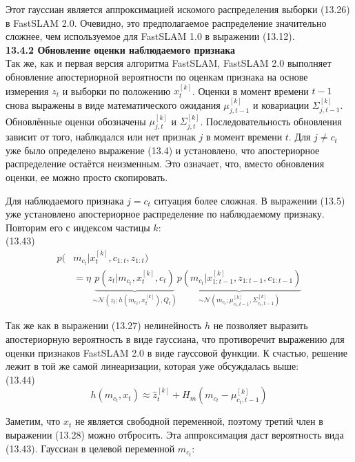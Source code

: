 \documentclass[10pt,a4paper]{article}
\begin{document}
Этот гауссиан является аппроксимацией искомого распределения выборки (13.26) в FastSLAM 2.0.  Очевидно, это предполагаемое распределение значительно сложнее, чем используемое для FastSLAM 1.0 в выражении (13.12).\\

\textbf{13.4.2	Обновление оценки наблюдаемого признака}\\

Так же, как и первая версия алгоритма FastSLAM, FastSLAM 2.0  выполняет обновление апостериорной вероятности по оценкам признака на основе измерения $z_t$ и выборки по положению $x_t^{[k]}$. Оценки в момент времени $t-1$ снова выражены в виде
математического ожидания $\mu_{j,t-1}^{[k]}$ и ковариации $\varSigma_{j,t-1}^{[k]}$. Обновлённые оценки обозначены $\mu_{j,t}^{[k]}$ и $\varSigma_{j,t}^{[k]}$. Последовательность обновления зависит от того, наблюдался или нет признак $j$ в момент времени $t$. Для $j\neq c_t$ уже было определено выражение (13.4) и установлено, что апостериорное распределение остаётся неизменным. Это означает, что, вместо обновления оценки, ее можно просто скопировать.

Для наблюдаемого признака $j=c_t$ ситуация более сложная. В выражении (13.5) уже установлено апостериорное распределение по наблюдаемому признаку. Повторим его с индексом частицы $k$:\\

(13.43)
\begin{equation*}
\begin{split}
p(&m_{c_t}|x_t^{[k]},c_{1:t},z_{1:t})\\
&=\eta\,\underbrace{p(z_t|m_{c_t},x_t^{[k]},c_t)}_{\sim\mathcal{N}(z_t;h(m_{c_t},x_t^{[k]}),Q_t)}\underbrace{p(m_{c_t}|x_{1:t-1}^{[k]},z_{1:t-1},c_{1:t-1})}_{\sim\mathcal{N}(m_{c_t};\mu_{c_t,t-1}^{[k]},\varSigma_{c_t,t-1}^{[k]})}
\end{split}
\end{equation*}

Так же как в выражении (13.27) нелинейность $h$ не позволяет выразить апостериорную вероятность в виде гауссиана, что противоречит выражению для оценки признаков FastSLAM 2.0 в виде гауссовой функции. К счастью, решение лежит в той же самой линеаризации, которая уже обсуждалась выше:\\

(13.44)
$$h(m_{c_t},x_t)\approx\hat{z}_t^{[k]}+H_m(m_{c_t}-\mu_{c_t,t-1}^{[k]})$$

Заметим, что $x_t$ не является свободной переменной, поэтому третий член в выражении (13.28) можно отбросить. Эта аппроксимация даст вероятность вида (13.43). Гауссиан в целевой переменной $m_{c_t}$:\\
\end{document}
